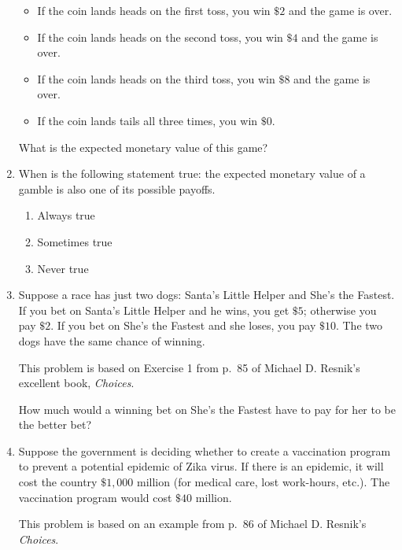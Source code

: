 \documentclass[justified]{tufte-book}
\providecommand{\tightlist}{%
  \setlength{\itemsep}{0pt}\setlength{\parskip}{0pt}}
\theoremstyle{definition}
\theoremstyle{definition}
\theoremstyle{definition}
\theoremstyle{definition}
\theoremstyle{remark}
\begin{document}
\begin{enumerate}
  \begin{itemize}
  \tightlist
  \item
    If the coin lands heads on the first toss, you win \(\$2\) and the game is over.
  \item
    If the coin lands heads on the second toss, you win \(\$4\) and the game is over.
  \item
    If the coin lands heads on the third toss, you win \(\$8\) and the game is over.
  \item
    If the coin lands tails all three times, you win \(\$0\).
  \end{itemize}

  What is the expected monetary value of this game?
\item
  When is the following statement true: the expected monetary value of a gamble is also one of its possible payoffs.

  \begin{enumerate}
  \def\labelenumii{\alph{enumii}.}
  \tightlist
  \item
    Always true
  \item
    Sometimes true
  \item
    Never true
  \end{enumerate}
\item
  Suppose a race has just two dogs: Santa's Little Helper and She's the Fastest. If you bet on Santa's Little Helper and he wins, you get \(\$5\); otherwise you pay \(\$2\). If you bet on She's the Fastest and she loses, you pay \(\$10\). The two dogs have the same chance of winning.

  \begin{marginfigure}
  This problem is based on Exercise 1 from p.~85 of Michael D. Resnik's
  excellent book, \emph{Choices}.
  \end{marginfigure}

  How much would a winning bet on She's the Fastest have to pay for her to be the better bet?
\item
  Suppose the government is deciding whether to create a vaccination program to prevent a potential epidemic of Zika virus. If there is an epidemic, it will cost the country \(\$1,000\) million (for medical care, lost work-hours, etc.). The vaccination program would cost \(\$40\) million.

  \begin{marginfigure}
  This problem is based on an example from p.~86 of Michael D. Resnik's
  \emph{Choices}.
  \end{marginfigure}


\end{enumerate}
\end{document}
